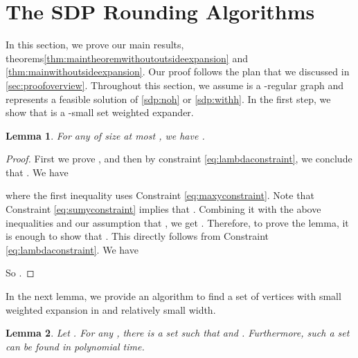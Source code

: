 \documentclass[11pt]{article}
\newtheorem{lemma}{Lemma}[section]
\begin{document}
\section{The SDP Rounding Algorithms}
\label{sec:sdprounding}
In this section, we prove our main results, theorems\ref{thm:maintheoremwithoutoutsideexpansion} and \ref{thm:mainwithoutsideexpansion}. 
Our proof follows the  plan that we discussed in \autoref{sec:proofoverview}.
Throughout this section, we assume  is a -regular graph and  represents a feasible solution of \ref{sdp:noh} or \ref{sdp:withh}. 
In the first step, we show that  is a -small set weighted expander.
\begin{lemma}
\label{lem:expandingsmallsets}
For any  of size at most , we have .
\end{lemma}
\begin{proof}
First we prove  , and then by  constraint \eqref{eq:lambdaconstraint}, we conclude that .
We have 

where the first inequality uses  Constraint \eqref{eq:maxyconstraint}. 
Note that Constraint \eqref{eq:sumyconstraint} implies that . Combining it with the above inequalities and our assumption that , we get . Therefore, to 
prove the lemma, it is enough to show that . This directly follows from Constraint \eqref{eq:lambdaconstraint}. We have 

So .
\end{proof}
In the next lemma, we provide an algorithm to find a set of vertices with small weighted expansion in  and relatively small width. 
\begin{lemma}
\label{lem:nonexpandingset}
Let . For any , there is a set  such that  and . Furthermore, such a set can be found in polynomial time. 
\end{lemma}
\end{document}
